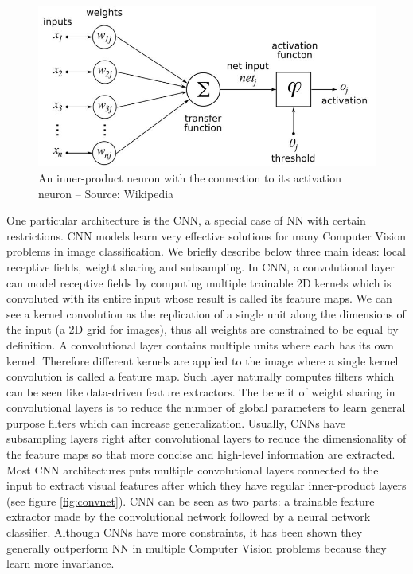 \documentclass[a4paper,12pt]{report}
\begin{document}
\begin{figure}[t]
    \begin{center}
        \includegraphics{thesis_figures/800px-ArtificialNeuronModel_english.jpg}
    \end{center}
    \caption{An inner-product neuron with the connection to its activation neuron -- Source: Wikipedia}
    \label{fig:artificial_neurons}
\end{figure}

One particular architecture is the CNN, a special case of NN with certain restrictions.
CNN models learn very effective solutions for many Computer Vision problems in image classification.
We briefly describe below three main ideas: local receptive fields, weight sharing and subsampling.
In CNN, a convolutional layer can model receptive fields by computing multiple trainable 2D kernels which is convoluted with its entire input whose result is called its feature maps.
We can see a kernel convolution as the replication of a single unit along the dimensions of the input (a 2D grid for images), thus all weights are constrained to be equal by definition.
A convolutional layer contains multiple units where each has its own kernel.
Therefore different kernels are applied to the image where a single kernel convolution is called a feature map.
Such layer naturally computes filters which can be seen like data-driven feature extractors.
The benefit of weight sharing in convolutional layers is to reduce the number of global parameters to learn general purpose filters which can increase generalization.
Usually, CNNs have subsampling layers right after convolutional layers to reduce the dimensionality of the feature maps so that more concise and high-level information are extracted.
Most CNN architectures puts multiple convolutional layers connected to the input to extract visual features after which they have regular inner-product layers (see figure \ref{fig:convnet}).
CNN can be seen as two parts: a trainable feature extractor made by the convolutional network followed by a neural network classifier.
Although CNNs have more constraints, it has been shown they generally outperform NN in multiple Computer Vision problems because they learn more invariance\cite{simard2003best}\cite{mnist_web}\cite{lawrence1997face}\cite{krizhevsky2012imagenet}.
\end{document}
